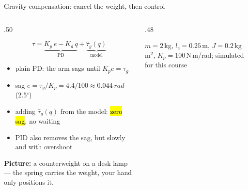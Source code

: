 \documentclass[aspectratio=169,10pt]{beamer}
\begin{document}
\begin{frame}{Gravity compensation: cancel the weight, then control}
\begin{columns}[T]
\begin{column}{.50\textwidth}
\small
\begin{eqbox}
\[ \tau=\underbrace{K_p\,e-K_d\,\dot q}_{\text{PD}}+\underbrace{\hat\tau_g(q)}_{\text{model}} \]
\end{eqbox}
\begin{itemize}\setlength\itemsep{.4mm}
\item plain PD: the arm sags until $K_p e=\tau_g$
\item sag $e=\tau_g/K_p=4.4/100\approx\SI{0.044}{rad}$ (2.5$^\circ$)
\item adding $\hat\tau_g(q)$ from the model: \hl{zero sag}, no waiting
\item PID also removes the sag, but slowly and with overshoot
\end{itemize}
\textbf{Picture:} a counterweight on a desk lamp --- the spring carries the weight, your hand only positions it.
\end{column}
\begin{column}{.48\textwidth}
\centering
{}

{\scriptsize $m=2$\,kg, $l_c=0.25$\,m, $J=0.2$\,kg\,m$^2$, $K_p=100$\,N\,m/rad; simulated for this course}
\end{column}
\end{columns}
\end{frame}
\end{document}
